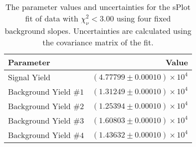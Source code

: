 
\begin{table}[ht]
    \begin{center}
        \begin{tabular}{lr}\toprule
            Parameter & Value \\\midrule
            Signal Yield & $(4.77799 \pm 0.00010) \times 10^{4}$ \\
            Background Yield $\#1$ & $(1.31249 \pm 0.00010) \times 10^{4}$ \\
            Background Yield $\#2$ & $(1.25394 \pm 0.00010) \times 10^{4}$ \\
            Background Yield $\#3$ & $(1.60803 \pm 0.00010) \times 10^{4}$ \\
            Background Yield $\#4$ & $(1.43632 \pm 0.00010) \times 10^{4}$ \\\bottomrule
        \end{tabular}
        \caption{The parameter values and uncertainties for the sPlot fit of data with $\chi^2_\nu < 3.00$ using four fixed background slopes. Uncertainties are calculated using the covariance matrix of the fit.}\label{tab:splot-fit-results-chisqdof-3.00-fixed-4}
    \end{center}
\end{table}
